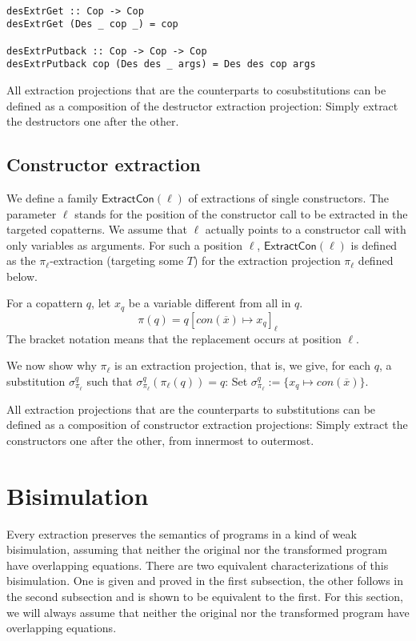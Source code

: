\begin{lstlisting}

desExtrGet :: Cop -> Cop
desExtrGet (Des _ cop _) = cop

desExtrPutback :: Cop -> Cop -> Cop
desExtrPutback cop (Des des _ args) = Des des cop args

\end{lstlisting}

All extraction projections that are the counterparts to cosubstitutions can be defined as a composition of the destructor extraction projection: Simply extract the destructors one after the other.

\subsection{Constructor extraction}

We define a family $\textsf{ExtractCon}(\ell)$ of extractions of single constructors. The parameter $\ell$ stands for the position of the constructor call to be extracted in the targeted copatterns. We assume that $\ell$ actually points to a constructor call with only variables as arguments. For such a position $\ell$, $\textsf{ExtractCon}(\ell)$ is defined as the $\pi_\ell$-extraction (targeting some $T$) for the extraction projection $\pi_\ell$ defined below.

For a copattern $q$, let $x_q$ be a variable different from all in $q$.
\[
\pi(q) = q[con(\overline{x}) \mapsto x_q]_\ell
\]
The bracket notation means that the replacement occurs at position $\ell$.

We now show why $\pi_\ell$ is an extraction projection, that is, we give, for each $q$, a substitution $\sigma^q_{\pi_\ell}$ such that $\sigma^q_{\pi_\ell}(\pi_\ell(q)) = q$: Set $\sigma^q_{\pi_\ell} := \{x_q \mapsto con(\overline{x})\}$.

All extraction projections that are the counterparts to substitutions can be defined as a composition of constructor extraction projections: Simply extract the constructors one after the other, from innermost to outermost.

\section{Bisimulation}
\label{sec:extrbis}

Every extraction preserves the semantics of programs in a kind of weak bisimulation, assuming that neither the original nor the transformed program have overlapping equations. There are two equivalent characterizations of this bisimulation. One is given and proved in the first subsection, the other follows in the second subsection and is shown to be equivalent to the first. For this section, we will always assume that neither the original nor the transformed program have overlapping equations.

